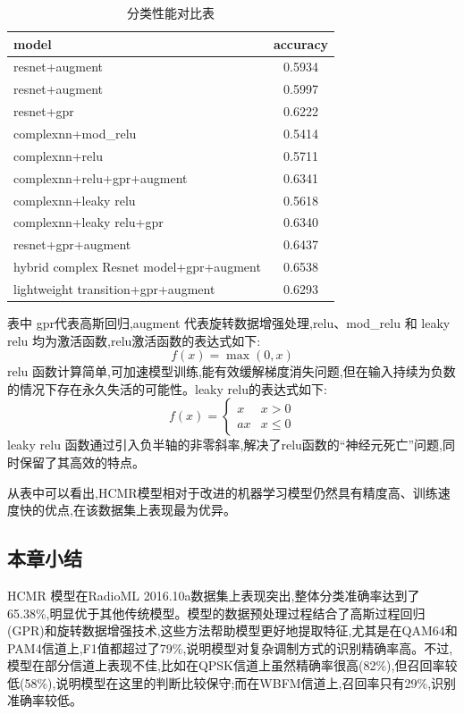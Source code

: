 \documentclass{article}
\begin{document}
\begin{CJK}{UTF8}{gbsn}
\begin{table}[H]
    \centering
    \caption{分类性能对比表}
    \begin{tabular}{|l|c|}
        \hline
        \textbf{model} & \textbf{accuracy} \\
        \hline
        resnet+augment & 0.5934 \\
        \hline
        resnet+augment & 0.5997 \\
        \hline
        resnet+gpr & 0.6222 \\
        \hline
        complexnn+mod\_relu & 0.5414 \\
        \hline
        complexnn+relu & 0.5711 \\
        \hline
        complexnn+relu+gpr+augment & 0.6341 \\
        \hline
        complexnn+leaky relu & 0.5618 \\
        \hline
        complexnn+leaky relu+gpr & 0.6340 \\
        \hline
        resnet+gpr+augment & 0.6437 \\
        \hline
        hybrid complex Resnet model+gpr+augment & 0.6538 \\
        \hline
        lightweight transition+gpr+augment & 0.6293 \\
        \hline
    \end{tabular}
    \label{tab:classification_performance_comparison}
\end{table}

表中 gpr代表高斯回归,augment 代表旋转数据增强处理,relu、mod\_relu 和 leaky relu 均为激活函数,relu激活函数的表达式如下:
\begin{equation}
    f(x)=\max(0,x)
    \label{eq:relu}
\end{equation}
relu 函数计算简单,可加速模型训练,能有效缓解梯度消失问题,但在输入持续为负数的情况下存在永久失活的可能性。leaky relu的表达式如下:
\begin{equation}
    f(x)=\begin{cases}x & x>0\\ ax & x\le0\end{cases}
    \label{eq:leaky_relu}
\end{equation}
leaky relu 函数通过引入负半轴的非零斜率,解决了relu函数的“神经元死亡”问题,同时保留了其高效的特点。

从表中可以看出,HCMR模型相对于改进的机器学习模型仍然具有精度高、训练速度快的优点,在该数据集上表现最为优异。

\subsection{本章小结}
HCMR 模型在RadioML 2016.10a数据集上表现突出,整体分类准确率达到了65.38\%,明显优于其他传统模型。模型的数据预处理过程结合了高斯过程回归(GPR)和旋转数据增强技术,这些方法帮助模型更好地提取特征,尤其是在QAM64和PAM4信道上,F1值都超过了79\%,说明模型对复杂调制方式的识别精确率高。不过,模型在部分信道上表现不佳,比如在QPSK信道上虽然精确率很高(82\%),但召回率较低(58\%),说明模型在这里的判断比较保守;而在WBFM信道上,召回率只有29\%,识别准确率较低。


\end{CJK}
\end{document}

